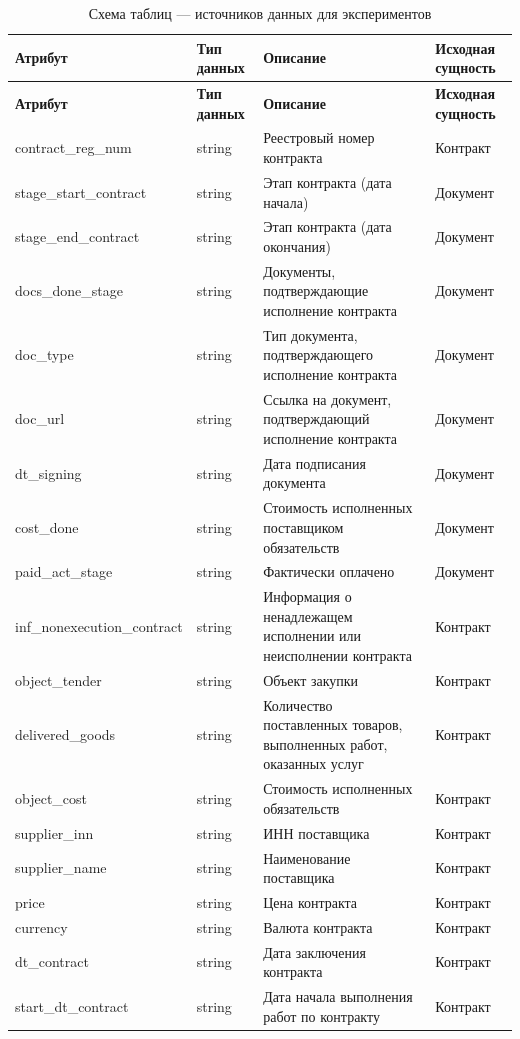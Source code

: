 \documentclass[12pt,letterpaper, onecolumn]{exam}
\begin{document}
\begin{longtable}{|p{4.5cm}|p{2cm}|p{8cm}|p{2cm}|}
\caption{Схема таблиц — источников данных для экспериментов}
\label{tab:schema} \\
\hline
\textbf{Атрибут} & \textbf{Тип данных} & \textbf{Описание} & \textbf{Исходная сущность} \\
\hline
\endfirsthead
\hline
\textbf{Атрибут} & \textbf{Тип данных} & \textbf{Описание} & \textbf{Исходная сущность} \\
\hline
\endhead
\hline
\endfoot
contract\_reg\_num & string & Реестровый номер контракта & Контракт \\
stage\_start\_contract & string & Этап контракта (дата начала) & Документ \\
stage\_end\_contract & string & Этап контракта (дата окончания) & Документ \\
docs\_done\_stage & string & Документы, подтверждающие исполнение контракта & Документ \\
doc\_type & string & Тип документа, подтверждающего исполнение контракта & Документ \\
doc\_url & string & Ссылка на документ, подтверждающий исполнение контракта & Документ \\
dt\_signing & string & Дата подписания документа & Документ \\
cost\_done & string & Стоимость исполненных поставщиком обязательств & Документ \\
paid\_act\_stage & string & Фактически оплачено & Документ \\
inf\_nonexecution\_contract & string & Информация о ненадлежащем исполнении или неисполнении контракта & Контракт \\
object\_tender & string & Объект закупки & Контракт \\
delivered\_goods & string & Количество поставленных товаров, выполненных работ, оказанных услуг & Контракт \\
object\_cost & string & Стоимость исполненных обязательств & Контракт \\
supplier\_inn & string & ИНН поставщика & Контракт \\
supplier\_name & string & Наименование поставщика & Контракт \\
price & string & Цена контракта & Контракт \\
currency & string & Валюта контракта & Контракт \\
dt\_contract & string & Дата заключения контракта & Контракт \\
start\_dt\_contract & string & Дата начала выполнения работ по контракту & Контракт \\

\end{longtable}
\end{document}
